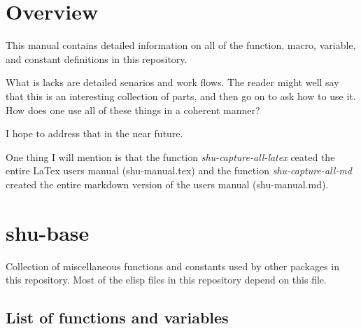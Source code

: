 



\section{Overview}


This manual contains detailed information on all of the function, macro,
variable, and constant definitions in this repository.

What is lacks are detailed senarios and work flows.  The reader might well
say that this is an interesting collection of parts, and then go on to ask
how to use it.  How does one use all of these things in a coherent manner?

I hope to address that in the near future.

One thing I will mention is that the function \emph{shu-capture-all-latex} ceated
the entire LaTex users manual (shu-manual.tex) and the function
\emph{shu-capture-all-md} created the entire markdown version of the users manual
(shu-manual.md).


\section{shu-base}


Collection of miscellaneous functions  and constants used by other
packages in this repository.  Most of the elisp files in this repository
depend on this file.


\subsection{List of functions and variables}

